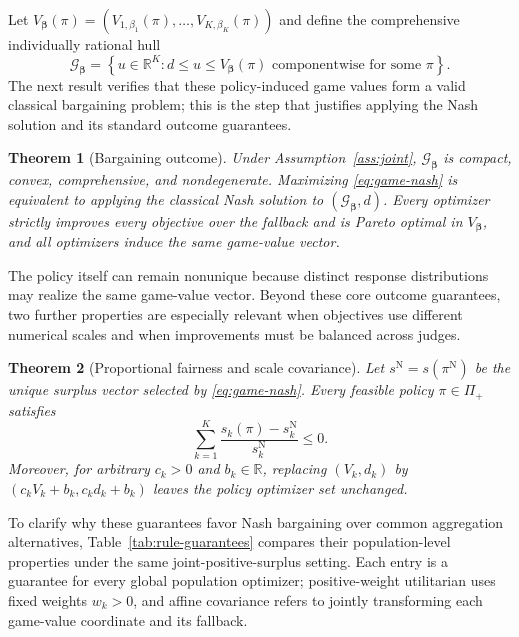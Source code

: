 \documentclass{article}
\newtheorem{theorem}{Theorem}
\theoremstyle{remark}
\theoremstyle{plain}
\newcommand{\G}{\mathcal{G}}
\newcommand{\R}{\mathbb{R}}
\begin{document}
Let $V_{\boldsymbol\beta}(\pi)=(V_{1,\beta_1}(\pi),\ldots,V_{K,\beta_K}(\pi))$ and define the comprehensive individually rational hull
\begin{equation}
\G_{\boldsymbol\beta}
=
\left\{u\in\R^K:
 d\le u\le V_{\boldsymbol\beta}(\pi)
 \text{ componentwise for some }\pi
\right\}.
\label{eq:comprehensive-hull}
\end{equation}
The next result verifies that these policy-induced game values form a valid classical bargaining problem; this is the step that justifies applying the Nash solution and its standard outcome guarantees.
\begin{theorem}[Bargaining outcome]
\label{thm:bargaining}
Under Assumption~\ref{ass:joint}, $\G_{\boldsymbol\beta}$ is compact, convex, comprehensive, and nondegenerate. Maximizing \eqref{eq:game-nash} is equivalent to applying the classical Nash solution to $(\G_{\boldsymbol\beta},d)$. Every optimizer strictly improves every objective over the fallback and is Pareto optimal in $V_{\boldsymbol\beta}$, and all optimizers induce the same game-value vector.
\end{theorem}
The policy itself can remain nonunique because distinct response distributions may realize the same game-value vector.
Beyond these core outcome guarantees, two further properties are especially relevant when objectives use different numerical scales and when improvements must be balanced across judges.

\begin{theorem}[Proportional fairness and scale covariance]
\label{thm:fairness}
Let $s^{\mathrm N}=s(\pi^{\mathrm N})$ be the unique surplus vector selected by \eqref{eq:game-nash}. Every feasible policy $\pi\in\Pi_+$ satisfies
\begin{equation}
\sum_{k=1}^K
\frac{s_k(\pi)-s_k^{\mathrm N}}{s_k^{\mathrm N}}
\le 0.
\label{eq:proportional-fairness}
\end{equation}
Moreover, for arbitrary $c_k>0$ and $b_k\in\R$, replacing $(V_k,d_k)$ by $(c_kV_k+b_k,c_kd_k+b_k)$ leaves the policy optimizer set unchanged.
\end{theorem}

To clarify why these guarantees favor Nash bargaining over common aggregation alternatives, Table~\ref{tab:rule-guarantees} compares their population-level properties under the same joint-positive-surplus setting. Each entry is a guarantee for every global population optimizer; positive-weight utilitarian uses fixed weights $w_k>0$, and affine covariance refers to jointly transforming each game-value coordinate and its fallback.
\end{document}
